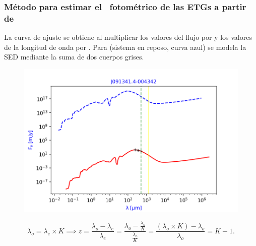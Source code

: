 \documentclass[8pt]{beamer}
\begin{document}
\begin{frame}

\frametitle{Método para estimar el \rt\ fotométrico de las ETGs a partir de \spire}

\vspace{2mm}

La curva de ajuste se obtiene al multiplicar los valores del flujo por \paramc y los valores de la longitud de onda por \paramk. Para  (sistema en reposo, curva azul) se modela la SED mediante la suma de dos cuerpos grises.

\begin{figure}[htb]
\centering
\includegraphics[scale=0.55]{ajuste_6.png}
\end{figure} 

\begin{equation*}
 {\lambda}_{o}={\lambda}_{e}\times K \implies z = \frac{{\lambda}_{o} - {\lambda}_{e}}{{\lambda}_{e}} = \frac{{\lambda}_{o} - \frac{{\lambda}_{o}}{K} }{ \frac{{\lambda}_{o}}{K} } = \frac{ ({\lambda}_{o} \times K) - {\lambda}_{o}}{{\lambda}_{o}} = K - 1.
\end{equation*}

\end{frame}
\end{document}
